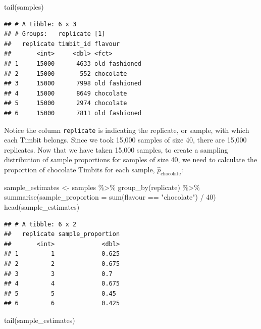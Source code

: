 \documentclass[
]{krantz}
\makeatletter
\newenvironment{Shaded}{\begin{snugshade}}{\end{snugshade}}
\newcommand{\AttributeTok}[1]{\textcolor[rgb]{0.61,0.61,0.61}{#1}}
\newcommand{\DecValTok}[1]{\textcolor[rgb]{0.06,0.06,0.06}{#1}}
\newcommand{\FunctionTok}[1]{\textcolor[rgb]{0,0,0}{#1}}
\newcommand{\NormalTok}[1]{#1}
\newcommand{\OtherTok}[1]{\textcolor[rgb]{0.37,0.37,0.37}{#1}}
\newcommand{\SpecialCharTok}[1]{\textcolor[rgb]{0,0,0}{#1}}
\newcommand{\StringTok}[1]{\textcolor[rgb]{0.5,0.5,0.5}{#1}}
\newenvironment{kframe}{%
\medskip{}
\setlength{\fboxsep}{.8em}
 \def\at@end@of@kframe{}%
 \ifinner\ifhmode%
  \def\at@end@of@kframe{\end{minipage}}%
  \begin{minipage}{\columnwidth}%
 \fi\fi%
 \def\FrameCommand##1{\hskip\@totalleftmargin \hskip-\fboxsep
 \colorbox{shadecolor}{##1}\hskip-\fboxsep
     \hskip-\linewidth \hskip-\@totalleftmargin \hskip\columnwidth}%
 \MakeFramed {\advance\hsize-\width
   \@totalleftmargin\z@ \linewidth\hsize
   \@setminipage}}%
 {\par\unskip\endMakeFramed%
 \at@end@of@kframe}
\renewenvironment{Shaded}{\begin{kframe}}{\end{kframe}}
\makeatother
\begin{document}
\begin{Shaded}
\begin{Highlighting}[]
\FunctionTok{tail}\NormalTok{(samples)}
\end{Highlighting}
\end{Shaded}

\begin{verbatim}
## # A tibble: 6 x 3
## # Groups:   replicate [1]
##   replicate timbit_id flavour      
##       <int>     <dbl> <fct>        
## 1     15000      4633 old fashioned
## 2     15000       552 chocolate    
## 3     15000      7998 old fashioned
## 4     15000      8649 chocolate    
## 5     15000      2974 chocolate    
## 6     15000      7811 old fashioned
\end{verbatim}

Notice the column \texttt{replicate} is indicating the replicate, or sample, with which each
Timbit belongs. Since we took 15,000 samples of size 40, there are 15,000 replicates.
Now that we have taken 15,000 samples, to create a sampling distribution of sample proportions for samples of size 40, we need to calculate the proportion of chocolate Timbits for each sample, \(\hat{p}_\text{chocolate}\):

\begin{Shaded}
\begin{Highlighting}[]
\NormalTok{sample\_estimates }\OtherTok{\textless{}{-}}\NormalTok{ samples }\SpecialCharTok{\%\textgreater{}\%}
  \FunctionTok{group\_by}\NormalTok{(replicate) }\SpecialCharTok{\%\textgreater{}\%}
  \FunctionTok{summarise}\NormalTok{(}\AttributeTok{sample\_proportion =} \FunctionTok{sum}\NormalTok{(flavour }\SpecialCharTok{==} \StringTok{"chocolate"}\NormalTok{) }\SpecialCharTok{/} \DecValTok{40}\NormalTok{)}
\FunctionTok{head}\NormalTok{(sample\_estimates)}
\end{Highlighting}
\end{Shaded}

\begin{verbatim}
## # A tibble: 6 x 2
##   replicate sample_proportion
##       <int>             <dbl>
## 1         1             0.625
## 2         2             0.675
## 3         3             0.7  
## 4         4             0.675
## 5         5             0.45 
## 6         6             0.425
\end{verbatim}

\begin{Shaded}
\begin{Highlighting}[]
\FunctionTok{tail}\NormalTok{(sample\_estimates)}
\end{Highlighting}
\end{Shaded}
\end{document}

